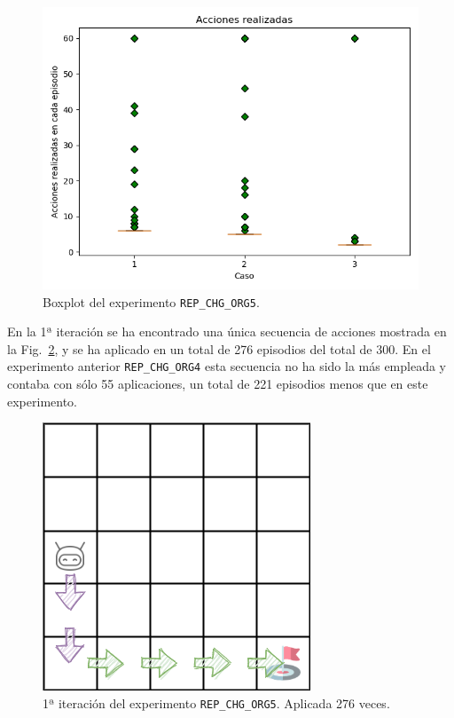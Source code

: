 \begin{figure}
    \centering
    \includegraphics[scale=0.4]{cap5_experimentacion/images/CHANGE_ORIGIN-20_09-19_22-2, 1, 0_boxplot.png}
    \caption{Boxplot del experimento \texttt{REP\_CHG\_ORG5}.}
    \label{fig:CHANGE_ORIGIN-20_09-19_22-2, 1, 0_boxplot}
\end{figure}

En la 1ª iteración se ha encontrado una única secuencia de acciones mostrada en la Fig.~\ref{fig:dim5_CHANGE_ORIGIN-20_09-00_52-2, 1, 0_1iter}, y se ha aplicado en un total de 276 episodios del total de 300. En el experimento anterior \texttt{REP\_CHG\_ORG4} esta secuencia no ha sido la más empleada y contaba con sólo 55 aplicaciones, un total de 221 episodios menos que en este experimento. \\

\begin{figure}
    \centering
    \includegraphics[scale=0.4]{cap5_experimentacion/images/dim5_CHANGE_ORIGIN-20_09-00_57-2, 0, 1_55.png}
    \caption{1ª iteración del experimento \texttt{REP\_CHG\_ORG5}. Aplicada 276 veces.}
    \label{fig:dim5_CHANGE_ORIGIN-20_09-00_52-2, 1, 0_1iter}
\end{figure}

